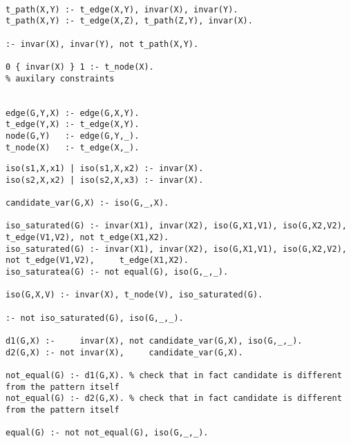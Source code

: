 \begin{lstlisting}[caption=ASP auxilary predicates, style=model]
%selects subpattern

t_path(X,Y) :- t_edge(X,Y), invar(X), invar(Y).
t_path(X,Y) :- t_edge(X,Z), t_path(Z,Y), invar(X).

:- invar(X), invar(Y), not t_path(X,Y).

0 { invar(X) } 1 :- t_node(X).
% auxilary constraints


edge(G,Y,X) :- edge(G,X,Y).
t_edge(Y,X) :- t_edge(X,Y).
node(G,Y)   :- edge(G,Y,_).
t_node(X)   :- t_edge(X,_).
\end{lstlisting}

\begin{lstlisting}[caption=ASP canonicity previous solution isomorphism check, style=model]
iso(s1,X,x1) | iso(s1,X,x2) :- invar(X).
iso(s2,X,x2) | iso(s2,X,x3) :- invar(X).

candidate_var(G,X) :- iso(G,_,X).

iso_saturated(G) :- invar(X1), invar(X2), iso(G,X1,V1), iso(G,X2,V2),     t_edge(V1,V2), not t_edge(X1,X2). 
iso_saturated(G) :- invar(X1), invar(X2), iso(G,X1,V1), iso(G,X2,V2), not t_edge(V1,V2),     t_edge(X1,X2). 
iso_saturatea(G) :- not equal(G), iso(G,_,_). 

iso(G,X,V) :- invar(X), t_node(V), iso_saturated(G).

:- not iso_saturated(G), iso(G,_,_).

d1(G,X) :-     invar(X), not candidate_var(G,X), iso(G,_,_).
d2(G,X) :- not invar(X),     candidate_var(G,X).

not_equal(G) :- d1(G,X). % check that in fact candidate is different from the pattern itself
not_equal(G) :- d2(G,X). % check that in fact candidate is different from the pattern itself

equal(G) :- not not_equal(G), iso(G,_,_).

\end{lstlisting}


